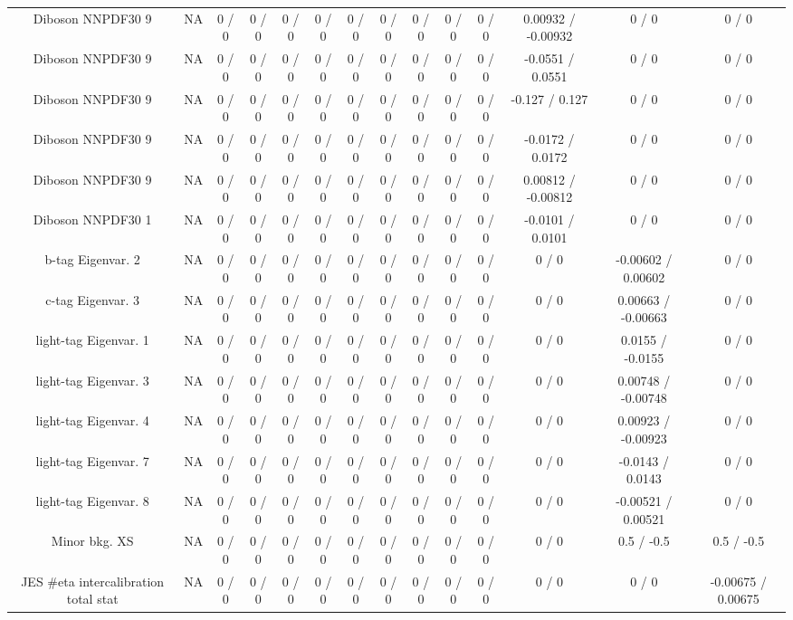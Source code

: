 \documentclass[10pt]{article}
\begin{document}
\begin{table}[htbp]
\begin{center}
\begin{tabular}{|c|c|c|c|c|c|c|c|c|c|c|c|c|c|}
  Diboson NNPDF30 9 &    NA    & 0 / 0 & 0 / 0 & 0 / 0 & 0 / 0 & 0 / 0 & 0 / 0 & 0 / 0 & 0 / 0 & 0 / 0 & 0.00932 / -0.00932 & 0 / 0 & 0 / 0 \\ 
  Diboson NNPDF30 9 &    NA    & 0 / 0 & 0 / 0 & 0 / 0 & 0 / 0 & 0 / 0 & 0 / 0 & 0 / 0 & 0 / 0 & 0 / 0 & -0.0551 / 0.0551 & 0 / 0 & 0 / 0 \\ 
  Diboson NNPDF30 9 &    NA    & 0 / 0 & 0 / 0 & 0 / 0 & 0 / 0 & 0 / 0 & 0 / 0 & 0 / 0 & 0 / 0 & 0 / 0 & -0.127 / 0.127 & 0 / 0 & 0 / 0 \\ 
  Diboson NNPDF30 9 &    NA    & 0 / 0 & 0 / 0 & 0 / 0 & 0 / 0 & 0 / 0 & 0 / 0 & 0 / 0 & 0 / 0 & 0 / 0 & -0.0172 / 0.0172 & 0 / 0 & 0 / 0 \\ 
  Diboson NNPDF30 9 &    NA    & 0 / 0 & 0 / 0 & 0 / 0 & 0 / 0 & 0 / 0 & 0 / 0 & 0 / 0 & 0 / 0 & 0 / 0 & 0.00812 / -0.00812 & 0 / 0 & 0 / 0 \\ 
  Diboson NNPDF30 1 &    NA    & 0 / 0 & 0 / 0 & 0 / 0 & 0 / 0 & 0 / 0 & 0 / 0 & 0 / 0 & 0 / 0 & 0 / 0 & -0.0101 / 0.0101 & 0 / 0 & 0 / 0 \\ 
  b-tag Eigenvar. 2 &    NA    & 0 / 0 & 0 / 0 & 0 / 0 & 0 / 0 & 0 / 0 & 0 / 0 & 0 / 0 & 0 / 0 & 0 / 0 & 0 / 0 & -0.00602 / 0.00602 & 0 / 0 \\ 
  c-tag Eigenvar. 3 &    NA    & 0 / 0 & 0 / 0 & 0 / 0 & 0 / 0 & 0 / 0 & 0 / 0 & 0 / 0 & 0 / 0 & 0 / 0 & 0 / 0 & 0.00663 / -0.00663 & 0 / 0 \\ 
  light-tag Eigenvar. 1 &    NA    & 0 / 0 & 0 / 0 & 0 / 0 & 0 / 0 & 0 / 0 & 0 / 0 & 0 / 0 & 0 / 0 & 0 / 0 & 0 / 0 & 0.0155 / -0.0155 & 0 / 0 \\ 
  light-tag Eigenvar. 3 &    NA    & 0 / 0 & 0 / 0 & 0 / 0 & 0 / 0 & 0 / 0 & 0 / 0 & 0 / 0 & 0 / 0 & 0 / 0 & 0 / 0 & 0.00748 / -0.00748 & 0 / 0 \\ 
  light-tag Eigenvar. 4 &    NA    & 0 / 0 & 0 / 0 & 0 / 0 & 0 / 0 & 0 / 0 & 0 / 0 & 0 / 0 & 0 / 0 & 0 / 0 & 0 / 0 & 0.00923 / -0.00923 & 0 / 0 \\ 
  light-tag Eigenvar. 7 &    NA    & 0 / 0 & 0 / 0 & 0 / 0 & 0 / 0 & 0 / 0 & 0 / 0 & 0 / 0 & 0 / 0 & 0 / 0 & 0 / 0 & -0.0143 / 0.0143 & 0 / 0 \\ 
  light-tag Eigenvar. 8 &    NA    & 0 / 0 & 0 / 0 & 0 / 0 & 0 / 0 & 0 / 0 & 0 / 0 & 0 / 0 & 0 / 0 & 0 / 0 & 0 / 0 & -0.00521 / 0.00521 & 0 / 0 \\ 
  Minor bkg. XS &    NA    & 0 / 0 & 0 / 0 & 0 / 0 & 0 / 0 & 0 / 0 & 0 / 0 & 0 / 0 & 0 / 0 & 0 / 0 & 0 / 0 & 0.5 / -0.5 & 0.5 / -0.5 \\ 
  JES #eta intercalibration total stat &    NA    & 0 / 0 & 0 / 0 & 0 / 0 & 0 / 0 & 0 / 0 & 0 / 0 & 0 / 0 & 0 / 0 & 0 / 0 & 0 / 0 & 0 / 0 & -0.00675 / 0.00675 \\ 

\end{tabular}
\end{center}
\end{table}
\end{document}
